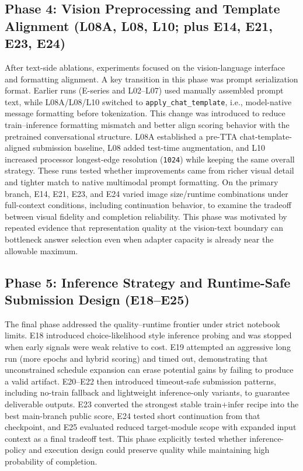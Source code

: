 \documentclass[11pt]{article}
\begin{document}
\subsection*{Phase 4: Vision Preprocessing and Template Alignment (L08A, L08, L10; plus E14, E21, E23, E24)}
After text-side ablations, experiments focused on the vision-language interface and formatting alignment. A key transition in this phase was prompt serialization format. Earlier runs (E-series and L02--L07) used manually assembled prompt text, while L08A/L08/L10 switched to \texttt{apply\_chat\_template}, i.e., model-native message formatting before tokenization. This change was introduced to reduce train--inference formatting mismatch and better align scoring behavior with the pretrained conversational structure. L08A established a pre-TTA chat-template-aligned submission baseline, L08 added test-time augmentation, and L10 increased processor longest-edge resolution (\texttt{1024}) while keeping the same overall strategy. These runs tested whether improvements came from richer visual detail and tighter match to native multimodal prompt formatting. On the primary branch, E14, E21, E23, and E24 varied image size/runtime combinations under full-context conditions, including continuation behavior, to examine the tradeoff between visual fidelity and completion reliability. This phase was motivated by repeated evidence that representation quality at the vision-text boundary can bottleneck answer selection even when adapter capacity is already near the allowable maximum.

\subsection*{Phase 5: Inference Strategy and Runtime-Safe Submission Design (E18--E25)}
The final phase addressed the quality--runtime frontier under strict notebook limits. E18 introduced choice-likelihood style inference probing and was stopped when early signals were weak relative to cost. E19 attempted an aggressive long run (more epochs and hybrid scoring) and timed out, demonstrating that unconstrained schedule expansion can erase potential gains by failing to produce a valid artifact. E20--E22 then introduced timeout-safe submission patterns, including no-train fallback and lightweight inference-only variants, to guarantee deliverable outputs. E23 converted the strongest stable train+infer recipe into the best main-branch public score, E24 tested short continuation from that checkpoint, and E25 evaluated reduced target-module scope with expanded input context as a final tradeoff test. This phase explicitly tested whether inference-policy and execution design could preserve quality while maintaining high probability of completion.
\end{document}
